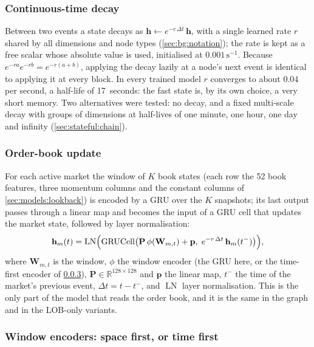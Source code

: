 \subsubsection{Continuous-time decay}
\label{sec:models:decay}

Between two events a state decays as $\mathbf{h} \leftarrow e^{-r\,\Delta t}\,\mathbf{h}$,
with a single learned rate $r$ shared by all dimensions and node types
(\cref{sec:bg:notation}); the rate is kept as a free scalar whose absolute value is used,
initialised at $0.001\,\mathrm{s}^{-1}$.  Because
$e^{-ra}e^{-rb} = e^{-r(a+b)}$, applying the decay lazily at a node's next event is
identical to applying it at every block.  In every trained model $r$ converges to about
$0.04$ per second, a half-life of 17~seconds: the fast state is, by its own choice, a
very short memory.  Two alternatives were tested: no decay, and a fixed multi-scale
decay with groups of dimensions at half-lives of one minute, one hour, one day and
infinity (\cref{sec:stateful:chain}).

\subsubsection{Order-book update}

For each active market the window of $K$ book states (each row the 52 book features, three
momentum columns and the constant columns of \cref{sec:models:lookback}) is encoded by a GRU over the
$K$ snapshots; its last output passes through a linear map and becomes the input of a GRU
cell that updates the market state, followed by layer normalisation:
\begin{equation}
  \mathbf{h}_m(t) = \operatorname{LN}\Bigl(\operatorname{GRUCell}\bigl(\mathbf{P}\,\phi(\mathbf{W}_{m,t}) + \mathbf{p},\;
  e^{-r\,\Delta t}\,\mathbf{h}_m(t^{-})\bigr)\Bigr),
  \label{eq:state-update}
\end{equation}
where $\mathbf{W}_{m,t}$ is the window, $\phi$ the window encoder (the GRU here, or the
time-first encoder of \cref{sec:models:encoders}), $\mathbf{P} \in \mathbb{R}^{128 \times 128}$
and $\mathbf{p}$ the linear map, $t^{-}$ the time of the market's previous event,
$\Delta t = t - t^{-}$, and $\operatorname{LN}$ layer normalisation.  This is the
only part of the model that reads the order book, and it is the same in the graph and in
the LOB-only variants.

\subsubsection{Window encoders: space first, or time first}
\label{sec:models:encoders}

